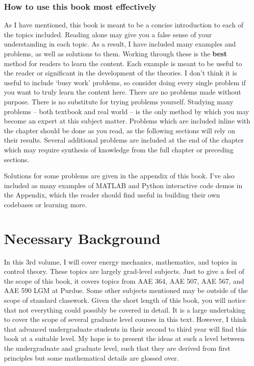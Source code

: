 \subsubsection{How to use this book most effectively}
As I have mentioned, this book is meant to be a concise introduction to each of the topics included. Reading alone may give you a false sense of your understanding in each topic. As a result, I have included many examples and problems, as well as solutions to them. Working through these is the \textbf{best} method for readers to learn the content. Each example is meant to be useful to the reader or significant in the development of the theories. I don't think it is useful to include `busy work' problems, so consider doing every single problem if you want to truly learn the content here. There are no problems made without purpose. There is no substitute for trying problems yourself. Studying many problems -- both textbook and real world -- is the only method by which you may become an expert at this subject matter. Problems which are included inline with the chapter should be done as you read, as the following sections will rely on their results. Several additional problems are included at the end of the chapter which may require synthesis of knowledge from the full chapter or preceding sections.

Solutions for some problems are given in the appendix of this book. I've also included as many examples of MATLAB and Python interactive code demos in the Appendix, which the reader should find useful in building their own codebases or learning more.


\section*{Necessary Background}
In this 3rd volume, I will cover energy mechanics, mathematics, and topics in control theory. These topics are largely grad-level subjects. Just to give a feel of the scope of this book, it covers topics from AAE 364, AAE 507, AAE 567, and AAE 590 LGM at Purdue. Some other subjects mentioned may be outside of the scope of standard classwork. Given the short length of this book, you will notice that not everything could possibly be covered in detail. It is a large undertaking to cover the scope of several graduate level courses in this text. However, I think that advanced undergraduate students in their second to third year will find this book at a suitable level. My hope is to present the ideas at such a level between the undergraduate and graduate level, such that they are derived from first principles but some mathematical details are glossed over.

